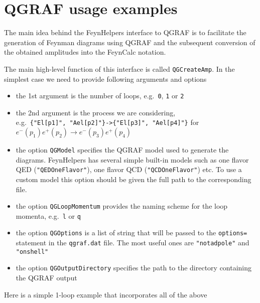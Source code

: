 \documentclass[../FeynHelpersManual.tex]{subfiles}
\begin{document}
\hypertarget{qgraf usage examples}{
\section{QGRAF usage examples}\label{qgraf usage examples}}

The main idea behind the FeynHelpers interface to QGRAF is to facilitate
the generation of Feynman diagrams using QGRAF and the subsequent
conversion of the obtained amplitudes into the FeynCalc notation.

The main high-level function of this interface is called
\texttt{QGCreateAmp}. In the simplest case we need to provide following
arguments and options

\begin{itemize}
\tightlist
\item
  the 1st argument is the number of loops, e.g.~\texttt{0}, \texttt{1}
  or \texttt{2}
\item
  the 2nd argument is the process we are considering,
  e.g.~\texttt{\{\allowbreak{}"El[\allowbreak{}p1]",\ \allowbreak{}"Ael[\allowbreak{}p2]"\}->\{\allowbreak{}"El[\allowbreak{}p3]",\ \allowbreak{}"Ael[\allowbreak{}p4]"\}}
  for \(e^- (p_1) e^+ (p_2) \to e^- (p_3) e^+ (p_4)\)
\item
  the option \texttt{QGModel} specifies the QGRAF model used to generate
  the diagrams. FeynHelpers has several simple built-in models such as
  one flavor QED (\texttt{"QEDOneFlavor"}), one flavor QCD
  (\texttt{"QCDOneFlavor"}) etc. To use a custom model this option
  should be given the full path to the corresponding file.
\item
  the option \texttt{QGLoopMomentum} provides the naming scheme for the
  loop momenta, e.g.~\texttt{l} or \texttt{q}
\item
  the option \texttt{QGOptions} is a list of string that will be passed
  to the \texttt{options=} statement in the \texttt{qgraf.dat} file. The
  most useful ones are \texttt{"notadpole"} and \texttt{"onshell"}
\item
  the option \texttt{QGOutputDirectory} specifies the path to the
  directory containing the QGRAF output
\end{itemize}

Here is a simple 1-loop example that incorporates all of the above
\end{document}
